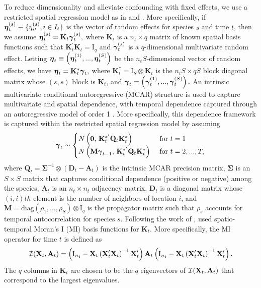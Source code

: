 To reduce dimensionality and alleviate confounding with fixed effects, we use a restricted spatial regression model as in \citet{hughes2013dimension} and \citet{bradley2015multivariate}. More specifically, if $\mbox{\boldmath $\eta$}_t^{(s)} \equiv \{\eta_{it}^{(s)}, i \in I_t\}$ is the vector of random effects for species $s$ and time $t$, then we assume $\mbox{\boldmath $\eta$}_{t}^{(s)}=\mathbf{K}_{t} \mbox{\boldmath $\gamma$}_{t}^{(s)},$ where $\mathbf{K}_{t}$ is a $n_t \times q$ matrix of known spatial basis functions such that $\mathbf{K}_{t}^{'} \mathbf{K}_{t}=\mathrm{I}_q$ and $\mbox{\boldmath $\gamma$}_{t}^{(s)}$ is a $q$-dimensional multivariate random effect. Letting $\mbox{\boldmath $\eta$}_t \equiv \left( \mbox{\boldmath $\eta$}_t^{(1)},...,\mbox{\boldmath $\eta$}_t^{(S)}\right)$ be the $n_tS$-dimensional vector of random effects, we have $\mbox{\boldmath $\eta$}_t = \mathbf{K}_t^* \mbox{\boldmath $\gamma$}_t,$ where $\mathbf{K}_t^* = \mathrm{I}_S \otimes \mathbf{K}_t$ is the $n_tS \times qS$ block diagonal matrix whose $(s,s)$ block is $\mathbf{K}_t$, and $\mbox{\boldmath $\gamma$}_t = \left( \mbox{\boldmath $\gamma$}_t^{(1)},...,\mbox{\boldmath $\gamma$}_t^{(S)}\right).$ An intrinsic multivariate conditional autoregressive (MCAR) structure is used to capture multivariate and spatial dependence, with temporal dependence captured through an autoregressive model of order 1 \citep{mardia1988multi}. More specifically, this dependence framework is captured within the restricted spatial regression model by assuming
\begin{equation}
    \mbox{\boldmath $\gamma$}_t \sim \begin{cases}
    N\left(\mathbf{0}, \, \mathbf{K}_t^{*'} \mathbf{Q}_t\mathbf{K}_t^{*}\right) & \text{ for } t=1 \\
    N\left(\mathbf{M} \mbox{\boldmath $\gamma$}_{t-1}, \, \mathbf{K}_t^{*'} \mathbf{Q}_t\mathbf{K}_t^{*}\right) & \text{ for } t=2,...,T,
    \end{cases}
\end{equation}
where $\mathbf{Q}_t = \boldsymbol{\Sigma}^{-1} \otimes \left(\mathbf{D}_t - \mathbf{A}_t \right)$ is the intrinsic MCAR precision matrix, $\boldsymbol{\Sigma}$ is an $S \times S$ matrix that captures conditional dependence (positive or negative) among the species, $\mathbf{A}_t$ is an $n_t \times n_t$ adjacency matrix,  $\mathbf{D}_t$ is a diagonal matrix whose $(i, i)th$ element is the number of neighbors of location $i$, and $\mathbf{M} = \text{diag}(\rho_1,...,\rho_S) \otimes \mathrm{I}_q$ is the propagator matrix such that $\rho_s$ accounts for temporal autocorrelation for species $s$. Following the work of \cite{bradley2015multivariate}, \cite{hepler2021spatiotemporal} used spatio-temporal Moran's I (MI) basis functions for $\mathbf{K}_t$. More specifically, the MI operator for time $t$ is defined as 
\begin{equation}
    \mathcal{I}({\bf X}_t, \mathbf{A}_t) = \left( \mathrm{I}_{n_t}-{\bf X}_t \left( {\bf X}_t' {\bf X}_t \right)^{-1} {\bf X}_t'  \right) \mathbf{A}_t \left( \mathrm{I}_{n_t}-{\bf X}_t \left( {\bf X}_t' {\bf X}_t \right)^{-1} {\bf X}_t'  \right).
\end{equation}
The $q$ columns in $\mathbf{K}_t$ are chosen to be the $q$ eigenvectors of $\mathcal{I}({\bf X}_t, \mathbf{A}_t)$ that correspond to the largest eigenvalues. 

